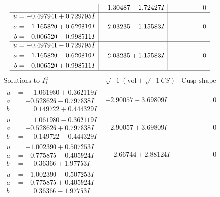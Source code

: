 \documentclass[1p]{elsarticle_modified}
\theoremstyle{definition}
\newcommand{\I}{\sqrt{-1}}
\begin{document}
$$\begin{array}{c|c|c}
 & -1.30487 - 1.72427 I & \phantom{-0.000000 } 0 \\ \hline\begin{aligned}
u &= -0.497941 + 0.729795 I \\
a &= \phantom{-}1.165820 + 0.629819 I \\
b &= \phantom{-}0.006520 - 0.998511 I\end{aligned}
 & -2.03235 - 1.15583 I & \phantom{-0.000000 } 0 \\ \hline\begin{aligned}
u &= -0.497941 - 0.729795 I \\
a &= \phantom{-}1.165820 - 0.629819 I \\
b &= \phantom{-}0.006520 + 0.998511 I\end{aligned}
 & -2.03235 + 1.15583 I & \phantom{-0.000000 } 0\\
 \hline 
 \end{array}$$\newpage$$\begin{array}{c|c|c}  
\text{Solutions to }I^u_{1}& \I (\text{vol} + \sqrt{-1}CS) & \text{Cusp shape}\\
 \hline 
\begin{aligned}
u &= \phantom{-}1.061980 + 0.362119 I \\
a &= -0.528626 - 0.797838 I \\
b &= \phantom{-}0.149722 + 0.444329 I\end{aligned}
 & -2.90057 - 3.69809 I & \phantom{-0.000000 } 0 \\ \hline\begin{aligned}
u &= \phantom{-}1.061980 - 0.362119 I \\
a &= -0.528626 + 0.797838 I \\
b &= \phantom{-}0.149722 - 0.444329 I\end{aligned}
 & -2.90057 + 3.69809 I & \phantom{-0.000000 } 0 \\ \hline\begin{aligned}
u &= -1.002390 + 0.507253 I \\
a &= -0.775875 - 0.405924 I \\
b &= \phantom{-}0.36366 + 1.97753 I\end{aligned}
 & \phantom{-}2.66744 + 2.88124 I & \phantom{-0.000000 } 0 \\ \hline\begin{aligned}
u &= -1.002390 - 0.507253 I \\
a &= -0.775875 + 0.405924 I \\
b &= \phantom{-}0.36366 - 1.97753 I\end{aligned}

\end{array}$$
\end{document}
